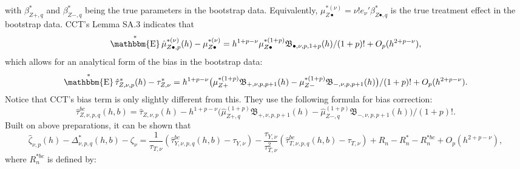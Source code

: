 \documentclass[12pt,]{article}
\DeclareMathOperator{\1}{\mathbbm{1}}
\DeclareMathOperator{\E}{\mathbbm{E}}
\newcommand{\Bf}{\mathfrak{B}}
\begin{document}
with $\beta_{Z+,q}^*$ and $\beta_{Z-,q}^*$ being the true parameters in the bootstrap data. Equivalently, $\mu_{Z \bullet}^{*(\nu)} = \nu! e_\nu' \beta_{Z \bullet,q}^*$ is the true treatment effect in the bootstrap data. CCT's Lemma SA.3 indicates that
\begin{align*}
	\E^* \hat\mu_{Z \bullet, p}^{* (\nu)}(h) - \mu_{Z \bullet}^{* (\nu)}
	= h^{1 + p - \nu} \mu_{Z \bullet}^{*(1 + p)} \Bf_{\bullet, \nu, p, 1+p}(h)/(1 + p)! + O_p(h^{2 + p - \nu}),
\end{align*}
which allows for an analytical form of the bias in the bootstrap data:
\begin{equation*}
	\E^* \hat \tau_{Z, \nu, p}^*(h) - \tau_{Z, \nu}^* 
	= h^{1 + p - \nu} \big(\mu_{Z+}^{*(1 + p)} \Bf_{+, \nu, p, p+1}(h) - \mu_{Z-}^{*(1 + p)} \Bf_{-, \nu, p, p+1}(h) \big)/(1 + p)! + O_p(h^{2 + p - \nu}).
\end{equation*}
Notice that CCT's bias term is only slightly different from this. They use the following formula for bias correction:
\begin{equation*}
	\hat\tau_{Z, \nu, p, q}^{bc} (h, b) = 
	\hat\tau_{Z, \nu, p} (h) - 
	h^{1 + p - \nu} \big(\hat \mu_{Z+, q}^{(1 + p)} \Bf_{+, \nu, p, p+1}(h) - \hat \mu_{Z-, q}^{(1 + p)} \Bf_{-, \nu, p, p+1}(h) \big)/(1 + p)!.
\end{equation*}
Built on above preparations, it can be shown that
\begin{equation}
	\label{eq: normality of bootstrap bias-corrected estimator}
	\hat\zeta_{\nu, p}(h) - \Delta_{\nu, p, q}^*(h,b) - \zeta_{\nu} 
	=  \frac{1}{\tau_{T, \nu}} (\hat\tau_{Y, \nu, p, q}^{bc} (h, b) - \tau_{Y, \nu}) - 
	   \frac{\tau_{Y, \nu}}{\tau_{T, \nu}^2} (\hat\tau_{T, \nu, p, q}^{bc} (h, b) - \tau_{T, \nu}) +  
	   R_n - R_n^* - R_n^{*bc} + O_p(h^{2 + p - \nu}),
\end{equation}
where $R_n^{*bc}$ is defined by:
\end{document}
